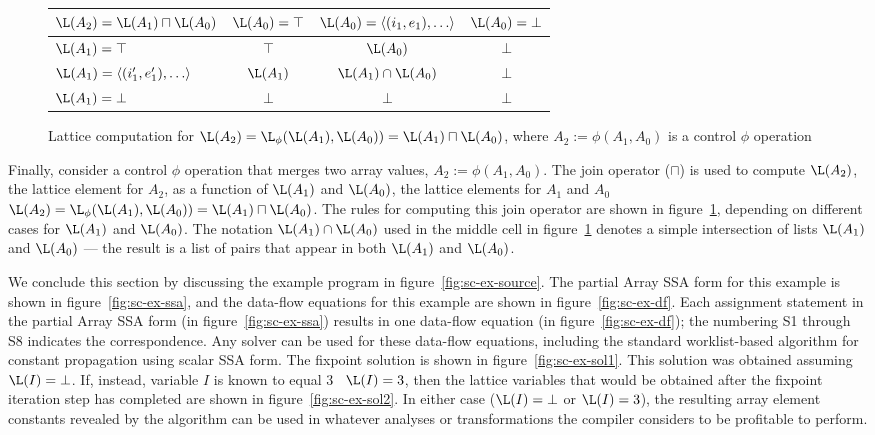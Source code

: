 \begin{figure}%
\begin{center}
\begin{tabular}{|l||c|c|c|}
\hline
$\L(A_2) = \L(A_1) \sqcap \L(A_0) $ & $\L(A_0) = \top$ & $\L(A_0) = \langle (i_1,e_1), \ldots \rangle $ & $\L(A_0) = \bot$ \\
\hline \hline
$\L(A_1) = \top$ & $\top$ & $\L(A_0)$ & $\bot$ \\
\hline
$\L(A_1) = \langle(i'_1,e'_1), \ldots\rangle$ & $\L(A_1)$ & $\L(A_1) \cap \L(A_0)$ & $\bot$ \\
\hline
$\L(A_1) = \bot$ & $\bot$ & $\bot$ & $\bot$ \\
\hline
\end{tabular}
\end{center}
\caption{Lattice computation for 
$\L(A_2) = \L_{\phi}(\L(A_1), \L(A_0)) = \L(A_1) \sqcap \L(A_0) $,
where $A_2 := \phi(A_1, A_0)$ is
a control $\phi$ operation}
\label{fig:join}
\end{figure}

Finally,
consider a control $\phi$ operation that merges two array values, $A_2 := \phi(A_1, A_0)$.
The join operator ($\sqcap$) is used to compute $\L(A_2)$,
the lattice element for $A_2$, as a function of 
$\L(A_1)$ and $\L(A_0)$,
the lattice elements for $A_1$ and $A_0$ 
\ie\ $\L(A_2) = \L_{\phi}(\L(A_1), \L(A_0)) = \L(A_1) \sqcap \L(A_0)$.
The rules for computing this
join operator are shown in figure~\ref{fig:join}, depending on
different cases for $\L(A_1)$ and $\L(A_0)$.
The notation $\L(A_1) \cap \L(A_0)$ used in the middle cell in
figure~\ref{fig:join} denotes a simple intersection of lists $\L(A_1)$ and 
$\L(A_0)$  --- the result is a list of pairs that appear in both
$\L(A_1)$ and 
$\L(A_0)$.


We conclude this section by discussing the
example program in figure~\ref{fig:sc-ex-source}.  The
partial Array SSA form for this example is shown in
figure~\ref{fig:sc-ex-ssa}, and 
the data-flow equations for this example are shown in
figure~\ref{fig:sc-ex-df}. Each assignment statement
in the partial Array SSA form
(in figure~\ref{fig:sc-ex-ssa})
results in one data-flow equation
(in figure~\ref{fig:sc-ex-df}); the numbering S1 through S8
indicates the correspondence.
Any solver can be used for these data-flow equations, including the
standard worklist-based algorithm for constant propagation using
scalar SSA form.
The fixpoint solution is shown in
figure~\ref{fig:sc-ex-sol1}.
This solution was obtained assuming $\L(I) = \bot$.  If, instead,
variable $I$ is known to equal 3 \ie\ $\L(I) = 3$, then 
the lattice variables that would be obtained
after the fixpoint iteration step has completed are shown in
figure~\ref{fig:sc-ex-sol2}.
In either case ($\L(I) = \bot$ or $\L(I) = 3$), the resulting array
element constants
revealed by the algorithm can be used in whatever analyses or
transformations the compiler considers to 
be profitable to perform. 


